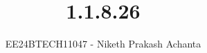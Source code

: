 \documentclass[journal]{IEEEtran}
\begin{document}

\vspace{3cm}

\title{1.1.8.26}
\author{EE24BTECH11047 - Niketh Prakash Achanta}
{\let\newpage\relax\maketitle}

\renewcommand{\thefigure}{\theenumi}
\renewcommand{\thetable}{\theenumi}
\setlength{\intextsep}{10pt} %


\renewcommand{\thetable}{\theenumi}
\end{document}
